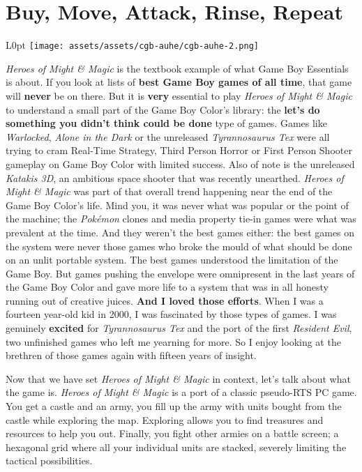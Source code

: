 \documentclass{book}
\begin{document}
\newpage\FloatBarrier\needspace{10mm}\section*{Buy, Move, Attack, Rinse, Repeat}\nopagebreak[4]
\begin{wrapfigure}{L}{0pt} \texttt{[image: assets/assets/cgb-auhe/cgb-auhe-2.png]}\end{wrapfigure}
\emph{Heroes of Might \& Magic} is the textbook example of what Game Boy Essentials is about. If you look at lists of \textbf{best Game Boy games of all time}, that game will \textbf{never} be on there. But it is \textbf{very} essential to play \emph{Heroes of Might \& Magic} to understand a small part of the Game Boy Color’s library: the \textbf{let’s do something you didn’t think could be done} type of games. Games like \emph{Warlocked}, \emph{Alone in the Dark} or the unreleased \emph{Tyrannosaurus Tex} were all trying to cram Real-Time Strategy, Third Person Horror or First Person Shooter gameplay on Game Boy Color with limited success. Also of note is the unreleased \emph{Katakis 3D}, an ambitious space shooter that was recently unearthed. \emph{Heroes of Might \& Magic} was part of that overall trend happening near the end of the Game Boy Color’s life. Mind you, it was never what was popular or the point of the machine; the \emph{Pokémon} clones and media property tie-in games were what was prevalent at the time. And they weren’t the best games either: the best games on the system were never those games who broke the mould of what should be done on an unlit portable system. The best games understood the limitation of the Game Boy. But games pushing the envelope were omnipresent in the last years of the Game Boy Color and gave more life to a system that was in all honesty running out of creative juices. \textbf{And I loved those efforts}. When I was a fourteen year-old kid in 2000, I was fascinated by those types of games. I was genuinely \textbf{excited} for \emph{Tyrannosaurus Tex} and the port of the first \emph{Resident Evil}, two unfinished games who left me yearning for more. So I enjoy looking at the brethren of those games again with fifteen years of insight.

Now that we have set \emph{Heroes of Might \& Magic} in context, let’s talk about what the game is. \emph{Heroes of Might \& Magic} is a port of a classic pseudo-RTS PC game. You get a castle and an army, you fill up the army with units bought from the castle while exploring the map. Exploring allows you to find treasures and resources to help you out. Finally, you fight other armies on a battle screen; a hexagonal grid where all your individual units are stacked, severely limiting the tactical possibilities.
\end{document}
